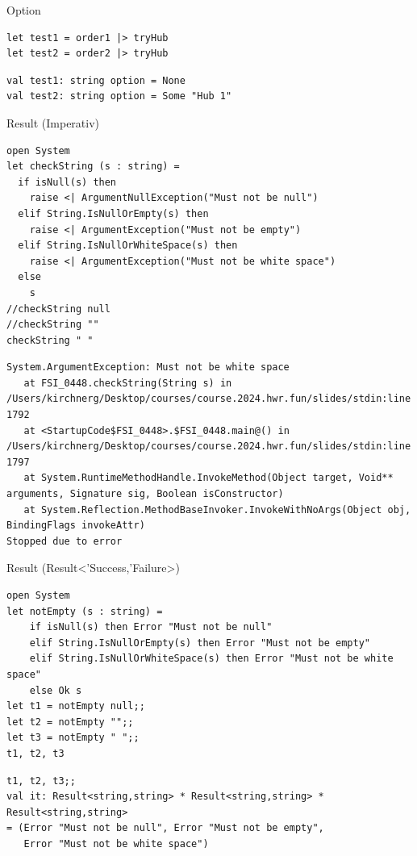 \documentclass[t]{beamer}
\begin{document}
\begin{frame}[label={sec:org08e6c4d},fragile]{Option}
 \begin{verbatim}
let test1 = order1 |> tryHub
let test2 = order2 |> tryHub
\end{verbatim}

\begin{verbatim}
val test1: string option = None
val test2: string option = Some "Hub 1"
\end{verbatim}
\end{frame}

\begin{frame}[label={sec:org9b6a3e3},fragile]{Result (Imperativ)}
 \begin{verbatim}
open System
let checkString (s : string) =
  if isNull(s) then
    raise <| ArgumentNullException("Must not be null")
  elif String.IsNullOrEmpty(s) then
    raise <| ArgumentException("Must not be empty")
  elif String.IsNullOrWhiteSpace(s) then
    raise <| ArgumentException("Must not be white space")
  else
    s
//checkString null
//checkString ""
checkString " "
\end{verbatim}

\begin{verbatim}
System.ArgumentException: Must not be white space
   at FSI_0448.checkString(String s) in /Users/kirchnerg/Desktop/courses/course.2024.hwr.fun/slides/stdin:line 1792
   at <StartupCode$FSI_0448>.$FSI_0448.main@() in /Users/kirchnerg/Desktop/courses/course.2024.hwr.fun/slides/stdin:line 1797
   at System.RuntimeMethodHandle.InvokeMethod(Object target, Void** arguments, Signature sig, Boolean isConstructor)
   at System.Reflection.MethodBaseInvoker.InvokeWithNoArgs(Object obj, BindingFlags invokeAttr)
Stopped due to error
\end{verbatim}
\end{frame}

\begin{frame}[label={sec:org50b4d07},fragile]{Result (Result<'Success,'Failure>)}
 \begin{verbatim}
open System
let notEmpty (s : string) =
    if isNull(s) then Error "Must not be null"
    elif String.IsNullOrEmpty(s) then Error "Must not be empty"
    elif String.IsNullOrWhiteSpace(s) then Error "Must not be white space"
    else Ok s
let t1 = notEmpty null;;
let t2 = notEmpty "";;
let t3 = notEmpty " ";;
t1, t2, t3
\end{verbatim}

\begin{verbatim}
t1, t2, t3;;
val it: Result<string,string> * Result<string,string> * Result<string,string>
= (Error "Must not be null", Error "Must not be empty",
   Error "Must not be white space")
\end{verbatim}
\end{frame}
\end{document}
